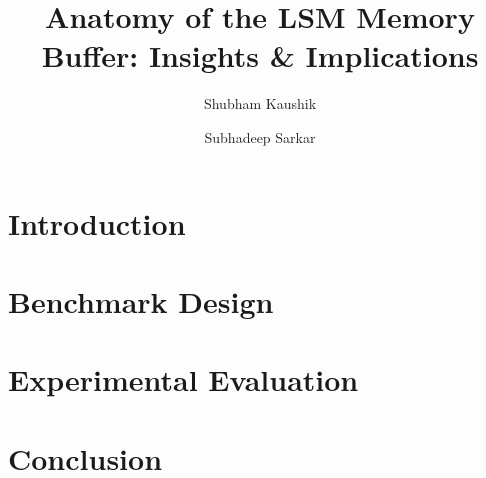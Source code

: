 \documentclass[sigconf,review]{acmart}
\begin{document}
\title{Anatomy of the LSM Memory Buffer: Insights \& Implications}

\author{Shubham Kaushik}


\author{Subhadeep Sarkar}

\begin{abstract}
     
\end{abstract}




\maketitle

\section{Introduction}
\label{sec:intro}


\section{Benchmark Design}
\label{sec:background}
 

% 
 
% 

% 

\section{Experimental Evaluation}
\label{sec:experimental_results}


% 
 
\section{Conclusion}
\label{sec:conclusion}



\balance 
{
 
} 
\end{document}
